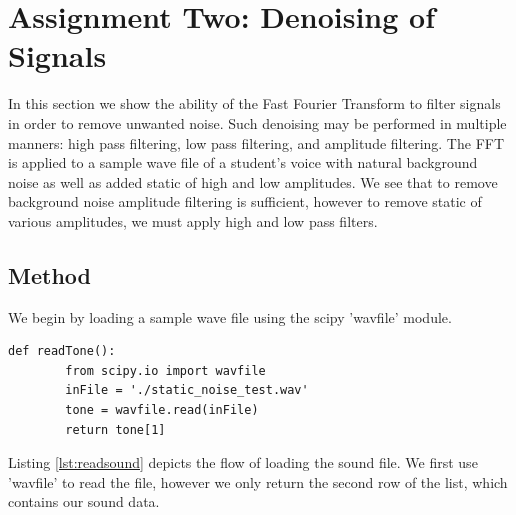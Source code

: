 
\section{Assignment Two: Denoising of Signals} %
\label{sec:assignment_two_denoising_of_signals}

In this section we show the ability of the Fast Fourier Transform to filter signals in order to remove unwanted noise. Such denoising may be performed in multiple manners: high pass filtering, low pass filtering, and amplitude filtering. The FFT is applied to a sample wave file of a student's voice with natural background noise as well as added static of high and low amplitudes. We see that to remove background noise amplitude filtering is sufficient, however to remove static of various amplitudes, we must apply high and low pass filters.

\subsection{Method} %
\label{sub:method}
We begin by loading a sample wave file using the scipy 'wavfile' module.

\begin{lstlisting}[caption={Sound File Reading},label=lst:readsound,firstnumber=6]
    def readTone():
        from scipy.io import wavfile
        inFile = './static_noise_test.wav'
        tone = wavfile.read(inFile)
        return tone[1]
\end{lstlisting}
Listing \ref{lst:readsound} depicts the flow of loading the sound file. We first use 'wavfile' to read the file, however we only return the second row of the list, which contains our sound data.

